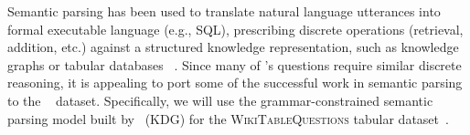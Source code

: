 
Semantic parsing
has been used to translate natural language utterances into formal executable language (e.g., SQL), prescribing discrete operations (retrieval, addition, etc.)
against a structured knowledge representation, such as knowledge graphs or tabular databases ~\citep[inter alia]{Zettlemoyer2005LearningTM,berant2013semantic,Yin2017ASN,chen2011learning}.
Since many of \drop's questions require similar discrete reasoning, it is appealing
to port some of the successful work in semantic parsing to the \drop~ dataset.
Specifically, we will use the grammar-constrained semantic parsing model
built by~\citet{Krishnamurthy2017neuralsp} (KDG) for the \textsc{WikiTableQuestions} tabular dataset~\citep{Pasupat2015CompositionalSP}. 


